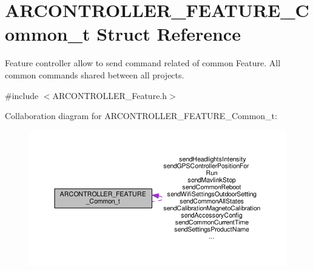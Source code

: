 \hypertarget{struct_a_r_c_o_n_t_r_o_l_l_e_r___f_e_a_t_u_r_e___common__t}{}\section{A\+R\+C\+O\+N\+T\+R\+O\+L\+L\+E\+R\+\_\+\+F\+E\+A\+T\+U\+R\+E\+\_\+\+Common\+\_\+t Struct Reference}
\label{struct_a_r_c_o_n_t_r_o_l_l_e_r___f_e_a_t_u_r_e___common__t}


Feature controller allow to send command related of common Feature. All common commands shared between all projects.  




{\ttfamily \#include $<$A\+R\+C\+O\+N\+T\+R\+O\+L\+L\+E\+R\+\_\+\+Feature.\+h$>$}



Collaboration diagram for A\+R\+C\+O\+N\+T\+R\+O\+L\+L\+E\+R\+\_\+\+F\+E\+A\+T\+U\+R\+E\+\_\+\+Common\+\_\+t\+:
\nopagebreak
\begin{figure}[H]
\begin{center}
\leavevmode
\includegraphics[width=350pt]{struct_a_r_c_o_n_t_r_o_l_l_e_r___f_e_a_t_u_r_e___common__t__coll__graph}
\end{center}
\end{figure}
